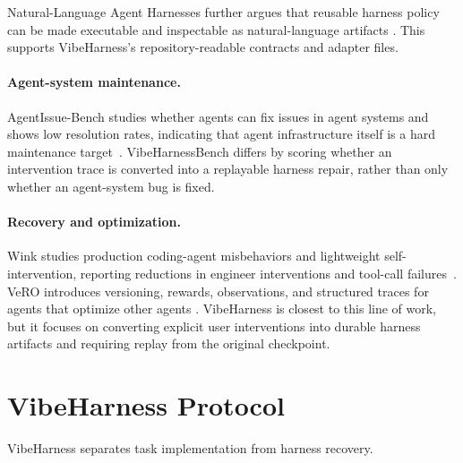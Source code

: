 \documentclass[11pt]{article}
\begin{document}
Natural-Language Agent Harnesses further argues that reusable harness policy can
be made executable and inspectable as natural-language artifacts
\cite{pan2026nlah}. This supports VibeHarness's repository-readable contracts
and adapter files.

\paragraph{Agent-system maintenance.}
AgentIssue-Bench studies whether agents can fix issues in agent systems and
shows low resolution rates, indicating that agent infrastructure itself is a hard
maintenance target~\cite{rahardja2025agentissues}. VibeHarnessBench differs by
scoring whether an intervention trace is converted into a replayable harness
repair, rather than only whether an agent-system bug is fixed.

\paragraph{Recovery and optimization.}
Wink studies production coding-agent misbehaviors and lightweight
self-intervention, reporting reductions in engineer interventions and tool-call
failures~\cite{nanda2026wink}. VeRO introduces versioning, rewards,
observations, and structured traces for agents that optimize other agents
\cite{ursekar2026vero}. VibeHarness is closest to this line of work, but it
focuses on converting explicit user interventions into durable harness artifacts
and requiring replay from the original checkpoint.

\section{VibeHarness Protocol}

VibeHarness separates task implementation from harness recovery.
\end{document}
